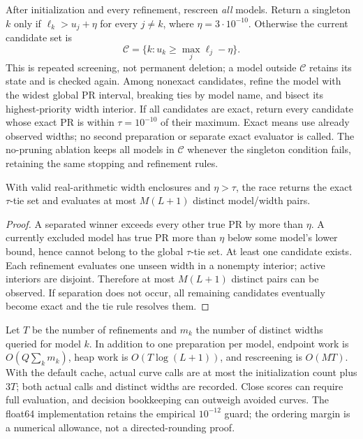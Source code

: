 After initialization and every refinement, rescreen \emph{all} models.
Return a singleton $k$ only if
$\ell_k>u_j+\eta$ for every $j\ne k$, where $\eta=3\cdot10^{-10}$.
Otherwise the current candidate set is
\[
 \mathcal C=\{k:u_k\ge\max_j\ell_j-\eta\}.
\]
This is repeated screening, not permanent deletion; a model outside
$\mathcal C$ retains its state and is checked again.
Among nonexact candidates, refine the model with the widest global PR interval,
breaking ties by model name, and bisect its highest-priority width interior.
If all candidates are exact, return every candidate whose exact PR is within
$\tau=10^{-10}$ of their maximum. Exact means use already observed widths;
no second preparation or separate exact evaluator is called.
The no-pruning ablation keeps all models in $\mathcal C$ whenever the
singleton condition fails, retaining the same stopping and refinement rules.

\begin{proposition}
With valid real-arithmetic width enclosures and $\eta>\tau$, the race returns
the exact $\tau$-tie set and evaluates at most $M(L+1)$ distinct model/width
pairs.
\end{proposition}
\begin{proof}
A separated winner exceeds every other true PR by more than $\eta$.
A currently excluded model has true PR more than $\eta$ below some model's
lower bound, hence cannot belong to the global $\tau$-tie set.
At least one candidate exists. Each refinement evaluates one unseen width
in a nonempty interior; active interiors are disjoint. Therefore at most
$M(L+1)$ distinct pairs can be observed. If separation does not occur, all
remaining candidates eventually become exact and the tie rule resolves them.
\end{proof}

Let $T$ be the number of refinements and $m_k$ the number of distinct widths
queried for model $k$. In addition to one preparation per model, endpoint work
is $O(Q\sum_km_k)$, heap work is $O(T\log(L+1))$, and rescreening is $O(MT)$.
With the default cache, actual curve calls are at most the initialization
count plus $3T$; both actual calls and distinct widths are recorded.
Close scores can require full evaluation, and decision bookkeeping can
outweigh avoided curves. The float64 implementation retains the empirical
$10^{-12}$ guard; the ordering margin is a numerical allowance, not a
directed-rounding proof.


